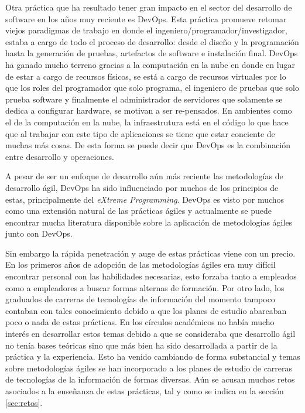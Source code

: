 \documentclass[journal]{IEEEtran}
\begin{document}
Otra práctica que ha resultado tener gran impacto en el sector del desarrollo de software en los años muy reciente es DevOps. Esta práctica promueve retomar viejos paradigmas de trabajo en donde el ingeniero/programador/investigador, estaba a cargo de todo el proceso de desarrollo: desde el diseño y la programación hasta la generación de pruebas, artefactos de software e instalación final. DevOps ha ganado mucho terreno gracias a la computación en la nube en donde en lugar de estar a cargo de recursos físicos, se está a cargo de recursos virtuales por lo que los roles del programador que solo programa, el ingeniero de pruebas que solo prueba software y finalmente el administrador de servidores que solamente se dedica a configurar hardware, se motivan a ser re-pensados. En ambientes como el de la computación en la nube, la infraestrutura está en el código lo que hace que al trabajar con este tipo de aplicaciones se tiene que estar conciente de muchas más cosas. De esta forma se puede decir que DevOps es la combinación entre desarrollo y operaciones. 

A pesar de ser un enfoque de desarrollo aún más reciente las metodologías de desarrollo ágil, DevOps ha sido influenciado por muchos de los principios de estas, principalmente del \emph{eXtreme Programming}. DevOps es visto por muchos como una extensión natural de las prácticas ágiles\cite{henrik-b} y actualmente se puede encontrar mucha literatura disponible sobre la aplicación de metodologías ágiles junto con DevOps.

Sin embargo la rápida penetración y auge de estas prácticas viene con un precio. En los primeros años de adopción de las metodologías ágiles era muy difícil encontrar personal con las habilidades necesarias, esto forzaba tanto a empleados como a empleadores a buscar formas alternas de formación. Por otro lado, los graduados de carreras de tecnologías de información del momento tampoco contaban con tales conocimiento debido a que los planes de estudio abarcaban poco o nada de estas prácticas. En los círculos académicos no había mucho interés en desarrollar estos temas debido a que se consideraba que desarrollo ágil no tenía bases teóricas sino que más bien ha sido desarrollada a partir de la práctica y la experiencia\cite{hazzan-dubinsky}. Esto ha venido cambiando de forma substancial y temas sobre metodologías ágiles se han incorporado a los planes de estudio de carreras de tecnologías de la información de formas diversas. Aún se acusan muchos retos asociados a la enseñanza de estas prácticas, tal y como se indica en la sección \ref{sec:retos}.
\end{document}
